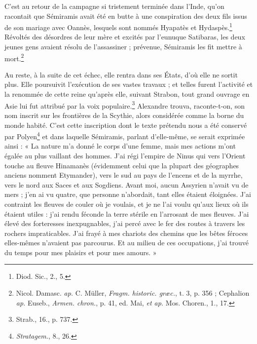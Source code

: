 \documentclass[a4paper, 11pt, oneside, landscape]{article}
\begin{document}
C'est au retour de la campagne si tristement terminée dans l'Inde, qu'on racontait que Sémiramis avait été en butte à une conspiration des deux fils issus de son mariage avec Oannès, lesquels sont nommés Hyapatès et Hydaspès.\footnote{Diod. Sic., 2., 5.} Révoltés des désordres de leur mère et excités par l'eunuque Satibaras, les deux jeunes gens avaient résolu de l'assassiner ; prévenue, Sémiramis les fit mettre à mort.\footnote{Nicol. Damasc. \emph{ap.} C. Müller, \emph{Fragm. historic. græc.}, t. 3, p. 356 ; Cephalion \emph{ap.} Euseb., \emph{Armen. chron.}, p. 41, ed. Mai, \emph{et ap.} Mos. Choren., 1., 17.}

Au reste, à la suite de cet échec, elle rentra dans ses États, d'où elle ne sortit plus. Elle poursuivit l'exécution de ses vastes travaux ; et telles furent l'activité et la renommée de cette reine qu'après elle, suivant Strabon, tout grand ouvrage en Asie lui fut attribué par la voix populaire.\footnote{Strab., 16., p. 737.} Alexandre trouva, raconte-t-on, son nom inscrit sur les frontières de la Scythie, alors considérée comme la borne du monde habité. C'est cette inscription dont le texte prétendu nous a été conservé par Polyen\footnote{\emph{Stratagem.}, 8., 26.} et dans laquelle Sémiramis, parlant d'elle-même, se serait exprimée ainsi : « La nature m'a donné le corps d'une femme, mais mes actions m'ont égalée au plus vaillant des hommes. J'ai régi l'empire de Ninus qui vers l'Orient touche au fleuve Hinamanès (évidemment celui que la plupart des géographes anciens nomment Etymander), vers le sud au pays de l'encens et de la myrrhe, vers le nord aux Saces et aux Sogdiens. Avant moi, aucun Assyrien n'avait vu de mers ; j'en ai vu quatre, que personne n'abordait, tant elles étaient éloignées. J'ai contraint les fleuves de couler où je voulais, et je ne l'ai voulu qu'aux lieux où ils étaient utiles : j'ai rendu féconde la terre stérile en l'arrosant de mes fleuves. J'ai élevé des forteresses inexpugnables, j'ai percé avec le fer des routes à travers les rochers impraticables. J'ai frayé à mes chariots des chemins que les bêtes féroces elles-mêmes n'avaient pas parcourus. Et au milieu de ces occupations, j'ai trouvé du temps pour mes plaisirs et pour mes amours. »
\end{document}
